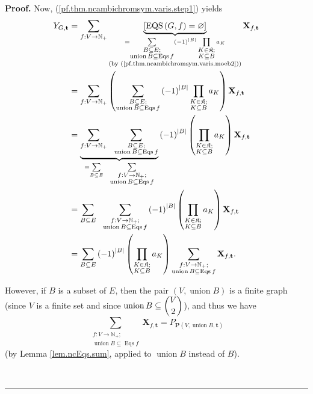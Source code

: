\documentclass[numbers=enddot,12pt,final,onecolumn,notitlepage]{scrartcl}%
\theoremstyle{definition}
\newenvironment{proof}[1][Proof]{\noindent\textbf{#1.} }{\ \rule{0.5em}{0.5em}}
\newenvironment{verlong}{}{}
\let\sumnonlimits\sum
\let\prodnonlimits\prod
\renewcommand{\sum}{\sumnonlimits\limits}
\renewcommand{\prod}{\prodnonlimits\limits}
\begin{document}
\begin{verlong}
\begin{proof}
Now, (\ref{pf.thm.ncambichromsym.varis.step1}) yields%
\begin{align}
Y_{G,\mathbf{t}}  &  =\sum_{f:V\rightarrow\mathbb{N}_{+}}\underbrace{\left[
\operatorname*{EQS}\left(  G,f\right)  =\varnothing\right]  }_{\substack{=\sum
_{\substack{B\subseteq E;\\\operatorname*{union}B\subseteq\operatorname*{Eqs}%
f}}\left(  -1\right)  ^{\left\vert B\right\vert }\prod_{\substack{K\in
\mathfrak{K};\\K\subseteq B}}a_{K}\\\text{(by
(\ref{pf.thm.ncambichromsym.varis.moeb2}))}}}\mathbf{X}_{f,\mathbf{t}%
}\nonumber\\
&  =\sum_{f:V\rightarrow\mathbb{N}_{+}}\left(  \sum_{\substack{B\subseteq
E;\\\operatorname*{union}B\subseteq\operatorname*{Eqs}f}}\left(  -1\right)
^{\left\vert B\right\vert }\prod_{\substack{K\in\mathfrak{K};\\K\subseteq
B}}a_{K}\right)  \mathbf{X}_{f,\mathbf{t}}\nonumber\\
&  =\underbrace{\sum_{f:V\rightarrow\mathbb{N}_{+}}\ \ \sum
_{\substack{B\subseteq E;\\\operatorname*{union}B\subseteq\operatorname*{Eqs}%
f}}}_{=\sum_{B\subseteq E}\ \ \sum_{\substack{f:V\rightarrow\mathbb{N}%
_{+};\\\operatorname*{union}B\subseteq\operatorname*{Eqs}f}}}\left(
-1\right)  ^{\left\vert B\right\vert }\left(  \prod_{\substack{K\in
\mathfrak{K};\\K\subseteq B}}a_{K}\right)  \mathbf{X}_{f,\mathbf{t}%
}\nonumber\\
&  =\sum_{B\subseteq E}\ \ \sum_{\substack{f:V\rightarrow\mathbb{N}%
_{+};\\\operatorname*{union}B\subseteq\operatorname*{Eqs}f}}\left(  -1\right)
^{\left\vert B\right\vert }\left(  \prod_{\substack{K\in\mathfrak{K}%
;\\K\subseteq B}}a_{K}\right)  \mathbf{X}_{f,\mathbf{t}}\nonumber\\
&  =\sum_{B\subseteq E}\left(  -1\right)  ^{\left\vert B\right\vert }\left(
\prod_{\substack{K\in\mathfrak{K};\\K\subseteq B}}a_{K}\right)  \sum
_{\substack{f:V\rightarrow\mathbb{N}_{+};\\\operatorname*{union}%
B\subseteq\operatorname*{Eqs}f}}\mathbf{X}_{f,\mathbf{t}}.
\label{pf.thm.ncambichromsym.varis.step4}%
\end{align}


However, if $B$ is a subset of $E$, then the pair $\left(
V,\operatorname*{union}B\right)  $ is a finite graph (since $V$ is a finite
set and since $\operatorname*{union}B\subseteq\dbinom{V}{2}$), and thus we
have%
\begin{equation}
\sum_{\substack{f:V\rightarrow\mathbb{N}_{+};\\\operatorname*{union}%
B\subseteq\operatorname*{Eqs}f}}\mathbf{X}_{f,\mathbf{t}}=P_{\mathbf{P}\left(
V,\operatorname*{union}B,\mathbf{t}\right)  }
\label{pf.thm.ncambichromsym.varis.p}%
\end{equation}
(by Lemma \ref{lem.ncEqs.sum}, applied to $\operatorname*{union}B$ instead of
$B$).


\end{proof}
\end{verlong}
\end{document}
